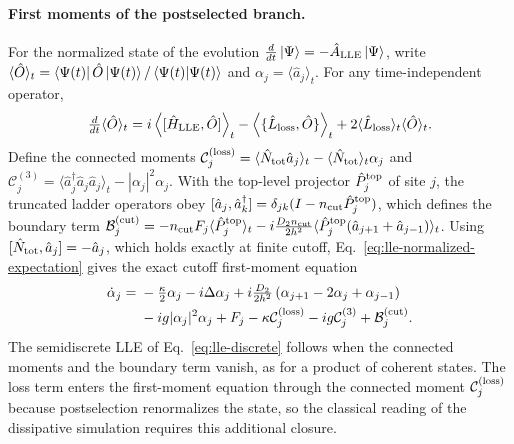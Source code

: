 \documentclass[pra,twocolumn,superscriptaddress,nofootinbib,floatfix]{revtex4-2}
\theoremstyle{remark}
\newcommand{\revcolor}{\color{blue}}
\DeclareRobustCommand{\rev}[1]{{\revcolor #1}}
\begin{document}
\paragraph{\rev{First moments of the postselected branch.}}
\rev{For the normalized state of the evolution \(\tfrac{d}{dt}\ket{\Psi}=-\hat A_{\rm LLE}\ket{\Psi}\), write \(\langle\hat O\rangle_t=\bra{\Psi(t)}\hat O\ket{\Psi(t)}/\braket{\Psi(t)}{\Psi(t)}\) and \(\alpha_j=\langle\hat a_j\rangle_t\).} \rev{For any time-independent operator,}
\begingroup\revcolor
\begin{align}
\tfrac{d}{dt}\langle\hat O\rangle_t= i\left\langle [\hat H_{\rm LLE},\hat O]\right\rangle_t - \left\langle\{\hat L_{\rm loss},\hat O\}\right\rangle_t+ 2\langle\hat L_{\rm loss}\rangle_t \langle\hat O\rangle_t .
\label{eq:lle-normalized-expectation}
\end{align}
\endgroup
\rev{Define the connected moments \(\mathcal C_{j}^{({\rm loss})}=\langle \hat N_{\rm tot}\hat a_j\rangle_t-\langle \hat N_{\rm tot}\rangle_t \alpha_j\) and \(\mathcal C_j^{(3)} = \langle \hat a_j^\dagger\hat a_j\hat a_j \rangle_t - |\alpha_j|^2\alpha_j\).} \rev{With the top-level projector \(\hat P_j^{\rm top}\) of site \(j\), the truncated ladder operators obey \([\hat a_j,\hat a_k^\dagger]=\delta_{jk}(I-n_{\rm cut}\hat P_j^{\rm top})\), which defines the boundary term \(\mathcal B_j^{({\rm cut})}=-n_{\rm cut}F_j\langle\hat P_j^{\rm top}\rangle_t-i\tfrac{D_2n_{\rm cut}}{2h^2}\langle\hat P_j^{\rm top}(\hat a_{j+1}+\hat a_{j-1})\rangle_t\).} \rev{Using \([\hat N_{\rm tot},\hat a_j]=-\hat a_j\), which holds exactly at finite cutoff, Eq.~\eqref{eq:lle-normalized-expectation} gives the exact cutoff first-moment equation}
\begingroup\revcolor
\begin{align}
\dot\alpha_j={}& -\tfrac{\kappa}{2}\alpha_j -i\Delta\alpha_j +i\tfrac{D_2}{2h^2}\left( \alpha_{j+1}-2\alpha_j+\alpha_{j-1} \right)\nonumber\\
&-ig|\alpha_j|^2\alpha_j +F_j - \kappa\mathcal C_j^{({\rm loss})} -ig\mathcal C_j^{(3)} + \mathcal B_j^{({\rm cut})}.
\label{eq:lle-first-moment-exact}
\end{align}
\endgroup
\rev{The semidiscrete LLE of Eq.~\eqref{eq:lle-discrete} follows when the connected moments and the boundary term vanish, as for a product of coherent states.} \rev{The loss term enters the first-moment equation through the connected moment \(\mathcal C_j^{({\rm loss})}\) because postselection renormalizes the state, so the classical reading of the dissipative simulation requires this additional closure.}
\end{document}
